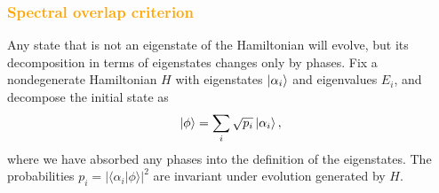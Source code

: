 \documentclass[aps,prx,reprint,superscriptaddress,footnote, twocolumn,notitlepage]{revtex4-2}
\newcommand{\ko}[1]{\textcolor{orange}{#1}}
\begin{document}

\subsubsection{\ko{Spectral overlap criterion}}
Any state that is not an eigenstate of the Hamiltonian will evolve, but its decomposition in terms of eigenstates changes only by phases. Fix a nondegenerate Hamiltonian $H$ with eigenstates $\ket{\alpha_i}$ and eigenvalues $E_i$, and decompose the initial state as
\begin{equation}
    \ket{\phi} = \sum_i \sqrt{p_i} \ket{\alpha_i},
\end{equation}
where we have absorbed any phases into the definition of the eigenstates. The probabilities $p_i = |\langle \alpha_i | \phi \rangle|^2$ are invariant under evolution generated by $H$.
\end{document}
